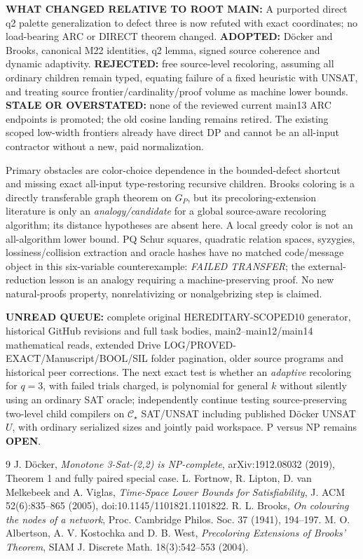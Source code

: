 \documentclass[11pt]{article}
\newcommand{\CS}{\mathcal C_{\star}}
\begin{document}
\textbf{WHAT CHANGED RELATIVE TO ROOT MAIN:} A purported direct q2 palette generalization to defect three is now refuted with exact coordinates; no load-bearing ARC or DIRECT theorem changed. \textbf{ADOPTED:} Döcker and Brooks, canonical M22 identities, q2 lemma, signed source coherence and dynamic adaptivity. \textbf{REJECTED:} free source-level recoloring, assuming all ordinary children remain typed, equating failure of a fixed heuristic with UNSAT, and treating source frontier/cardinality/proof volume as machine lower bounds. \textbf{STALE OR OVERSTATED:} none of the reviewed current main13 ARC endpoints is promoted; the old cosine landing remains retired. The existing scoped low-width frontiers already have direct DP and cannot be an all-input contractor without a new, paid normalization.

Primary obstacles are color-choice dependence in the bounded-defect shortcut and missing exact all-input type-restoring recursive children. Brooks coloring is a directly transferable graph theorem on \(G_P\), but its precoloring-extension literature \cite{precolor} is only an \emph{analogy/candidate} for a global source-aware recoloring algorithm; its distance hypotheses are absent here. A local greedy color is not an all-algorithm lower bound. PQ Schur squares, quadratic relation spaces, syzygies, lossiness/collision extraction and oracle hashes have no matched code/message object in this six-variable counterexample: \emph{FAILED TRANSFER}; the external-reduction lesson is an analogy requiring a machine-preserving proof. No new natural-proofs property, nonrelativizing or nonalgebrizing step is claimed.

\textbf{UNREAD QUEUE:} complete original HEREDITARY-SCOPED10 generator, historical GitHub revisions and full task bodies, main2--main12/main14 mathematical reads, extended Drive LOG/PROVED-EXACT/Manuscript/BOOL/SIL folder pagination, older source programs and historical peer corrections. The next exact test is whether an \emph{adaptive} recoloring for \(q=3\), with failed trials charged, is polynomial for general \(k\) without silently using an ordinary SAT oracle; independently continue testing source-preserving two-level child compilers on \(\CS\) SAT/UNSAT including published Döcker UNSAT \(U\), with ordinary serialized sizes and jointly paid workspace. P versus NP remains \textbf{OPEN}.

\begin{thebibliography}{9}
 J. D\"ocker, \emph{Monotone 3-Sat-(2,2) is NP-complete}, arXiv:1912.08032 (2019), Theorem 1 and fully paired special case.
 L. Fortnow, R. Lipton, D. van Melkebeek and A. Viglas, \emph{Time-Space Lower Bounds for Satisfiability}, J. ACM 52(6):835--865 (2005), doi:10.1145/1101821.1101822.
 R. L. Brooks, \emph{On colouring the nodes of a network}, Proc. Cambridge Philos. Soc. 37 (1941), 194--197.
 M. O. Albertson, A. V. Kostochka and D. B. West, \emph{Precoloring Extensions of Brooks' Theorem}, SIAM J. Discrete Math. 18(3):542--553 (2004).
\end{thebibliography}
\end{document}
